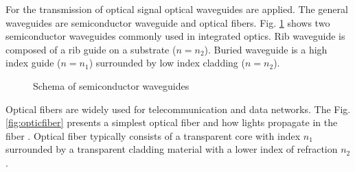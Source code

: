 For the transmission of optical signal optical waveguides are applied. The general waveguides are semiconductor waveguide and optical fibers. 
Fig. \ref{fig:semi_waveguides} shows two semiconductor waveguides commonly used in integrated optics. Rib waveguide is composed of a rib guide on a substrate ($n=n_{2}$). Buried waveguide is a high index guide ($n=n_{1}$) surrounded by low index cladding ($n=n_{2}$).\\
\begin{figure}
\centering
{}
\hfill
{}
\caption{Schema of semiconductor waveguides}
\label{fig:semi_waveguides}
\end{figure}
Optical fibers are widely used for telecommunication and data networks. The Fig.\ref{fig:opticfiber} presents a simplest optical fiber and how lights propagate in the fiber . Optical fiber typically consists of a transparent core with index $n_{1}$ surrounded by a transparent cladding material with a lower index of refraction $n_{2}$. 



